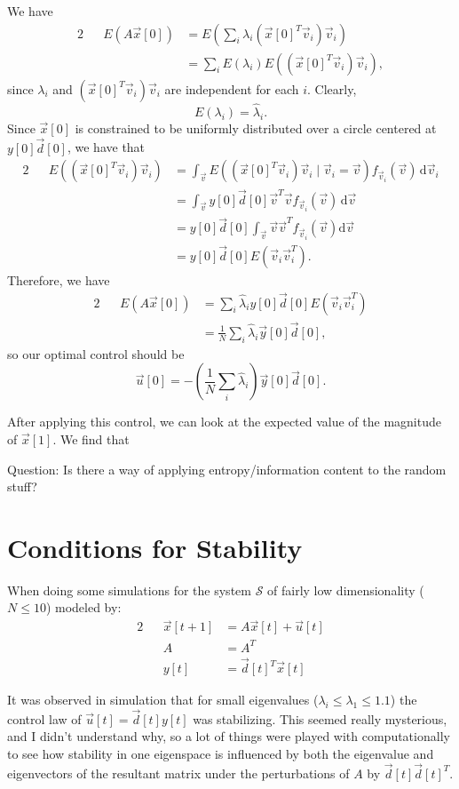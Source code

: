 \documentclass[letterpaper]{article}
\theoremstyle{remark}
\newcommand{\diff}{\mathrm{d}}
\newcommand{\eqn}[1]{\begin{alignat*}{2}#1\end{alignat*}}
\begin{document}
We have
\eqn{
    && E(A\vec{x}[0]) &= E\left(\sum_i \lambda_i (\vec{x}[0]^T\vec{v}_i) \vec{v}_i \right)\\
    &&&= \sum_i E(\lambda_i) E((\vec{x}[0]^T\vec{v}_i)\vec{v}_i),
}
since $\lambda_i$ and $(\vec{x}[0]^T\vec{v}_i)\vec{v}_i$ are independent for each $i$. Clearly,
\[
    E(\lambda_i) = \hat{\lambda}_i.
\]
Since $\vec{x}[0]$ is constrained to be uniformly distributed over a circle centered at $y[0]\vec{d}[0]$, we have that
\eqn{
    && E((\vec{x}[0]^T\vec{v}_i)\vec{v}_i) &= \int_{\vec{v}} E((\vec{x}[0]^T \vec{v}_i)\vec{v}_i \mid \vec{v}_i = \vec{v}) f_{\vec{v}_i}(\vec{v}) \, \diff \vec{v}_i \\
    &&&= \int_{\vec{v}} y[0]\vec{d}[0] \vec{v}^T \vec{v} f_{\vec{v}_i}(\vec{v}) \, \diff \vec{v} \\
    &&&= y[0]\vec{d}[0] \int_{\vec{v}} \vec{v}\vec{v}^T f_{\vec{v}_i}(\vec{v}) \diff \vec{v} \\
    &&&= y[0]\vec{d}[0]E(\vec{v}_i\vec{v}_i^T).
}
Therefore, we have
\eqn{
    && E(A\vec{x}[0]) &= \sum_i \hat{\lambda}_i y[0] \vec{d}[0] E(\vec{v}_i\vec{v}_i^T) \\
    &&&= \frac{1}{N}\sum_i \hat{\lambda}_i\vec{y}[0]\vec{d}[0],
}
so our optimal control should be
\[
    \vec{u}[0] = -\left(\frac{1}{N} \sum_i \hat{\lambda}_i\right) \vec{y}[0] \vec{d}[0].
\]

After applying this control, we can look at the expected value of the magnitude of $\vec{x}[1]$. We find that

Question: Is there a way of applying entropy/information content to the random stuff?

\section*{Conditions for Stability}
When doing some simulations for the system $\mathcal{S}$ of fairly low dimensionality ($N \leq 10$) modeled by:
\eqn{
    &&\vec{x}[t+1] &= A\vec{x}[t] + \vec{u}[t]\\
    &&A &=A^T\\
    &&y[t] &= \vec{d}[t]^T\vec{x}[t]
}

It was observed in simulation that for small eigenvalues ($\lambda_i \leq \lambda_1 \leq 1.1$) the control law of $\vec{u}[t] = \vec{d}[t]y[t]$ was stabilizing. This seemed really mysterious, and I didn't understand why, so a lot of things were played with computationally to see how stability in one eigenspace is influenced by both the eigenvalue and eigenvectors of the resultant matrix under the perturbations of $A$ by $\vec{d}[t]\vec{d}[t]^T$.
\end{document}
